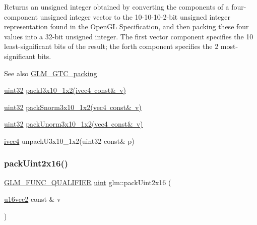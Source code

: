 Returns an unsigned integer obtained by converting the components of a four-\/component unsigned integer vector to the 10-\/10-\/10-\/2-\/bit unsigned integer representation found in the Open\+GL Specification, and then packing these four values into a 32-\/bit unsigned integer. The first vector component specifies the 10 least-\/significant bits of the result; the forth component specifies the 2 most-\/significant bits.

\begin{DoxySeeAlso}{See also}
\mbox{\hyperlink{group__gtc__packing}{G\+L\+M\+\_\+\+G\+T\+C\+\_\+packing}} 

\mbox{\hyperlink{group__gtc__type__precision_ga202b6a53c105fcb7e531f9b443518451}{uint32}} \mbox{\hyperlink{group__gtc__packing_ga032e18fa5bc5b8f3897104aeb2f1e195}{pack\+I3x10\+\_\+1x2(ivec4 const\& v)}} 

\mbox{\hyperlink{group__gtc__type__precision_ga202b6a53c105fcb7e531f9b443518451}{uint32}} \mbox{\hyperlink{group__gtc__packing_ga0d4157cec37c0312216a7be1cc92df54}{pack\+Snorm3x10\+\_\+1x2(vec4 const\& v)}} 

\mbox{\hyperlink{group__gtc__type__precision_ga202b6a53c105fcb7e531f9b443518451}{uint32}} \mbox{\hyperlink{group__gtc__packing_ga2cf2d11b40bd48639110456fd74c2e33}{pack\+Unorm3x10\+\_\+1x2(vec4 const\& v)}} 

\mbox{\hyperlink{group__core__types_gaa4560ddc50320ea8f8a70d5c9c249fea}{ivec4}} unpack\+U3x10\+\_\+1x2(uint32 const\& p) 
\end{DoxySeeAlso}
\mbox{\label{group__gtc__packing_gad5ca2e64edae3c233657c9fb0d18a9c9}} 
\subsubsection{\texorpdfstring{pack\+Uint2x16()}{packUint2x16()}}
{\footnotesize\ttfamily \mbox{\hyperlink{setup_8hpp_a33fdea6f91c5f834105f7415e2a64407}{G\+L\+M\+\_\+\+F\+U\+N\+C\+\_\+\+Q\+U\+A\+L\+I\+F\+I\+ER}} \mbox{\hyperlink{group__core__precision_ga4fd29415871152bfb5abd588334147c8}{uint}} glm\+::pack\+Uint2x16 (\begin{DoxyParamCaption}\item[{\mbox{\hyperlink{group__gtc__type__precision_ga50bd2ceeb100a187e7c46f135269a0ec}{u16vec2}} const \&}]{v }\end{DoxyParamCaption})}

